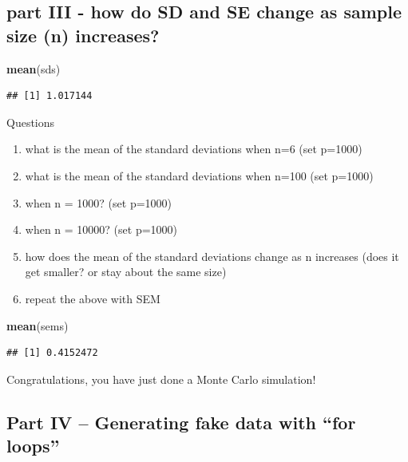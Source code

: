 \documentclass[]{book}
\newenvironment{Shaded}{\begin{snugshade}}{\end{snugshade}}
\newcommand{\KeywordTok}[1]{\textcolor[rgb]{0.13,0.29,0.53}{\textbf{#1}}}
\newcommand{\NormalTok}[1]{#1}
\providecommand{\tightlist}{%
  \setlength{\itemsep}{0pt}\setlength{\parskip}{0pt}}
\theoremstyle{definition}
\theoremstyle{definition}
\theoremstyle{definition}
\theoremstyle{remark}
\begin{document}
\subsection{part III - how do SD and SE change as sample size (n)
increases?}\label{part-iii---how-do-sd-and-se-change-as-sample-size-n-increases}

\begin{Shaded}
\begin{Highlighting}[]
\KeywordTok{mean}\NormalTok{(sds)}
\end{Highlighting}
\end{Shaded}

\begin{verbatim}
## [1] 1.017144
\end{verbatim}

Questions

\begin{enumerate}
\def\labelenumi{\arabic{enumi}.}
\tightlist
\item
  what is the mean of the standard deviations when n=6 (set p=1000)
\item
  what is the mean of the standard deviations when n=100 (set p=1000)
\item
  when n = 1000? (set p=1000)
\item
  when n = 10000? (set p=1000)
\item
  how does the mean of the standard deviations change as n increases
  (does it get smaller? or stay about the same size)
\item
  repeat the above with SEM
\end{enumerate}

\begin{Shaded}
\begin{Highlighting}[]
\KeywordTok{mean}\NormalTok{(sems)}
\end{Highlighting}
\end{Shaded}

\begin{verbatim}
## [1] 0.4152472
\end{verbatim}

Congratulations, you have just done a Monte Carlo simulation!

\subsection{\texorpdfstring{Part IV -- Generating fake data with ``for
loops''}{Part IV -- Generating fake data with for loops}}\label{part-iv-generating-fake-data-with-for-loops}
\end{document}
